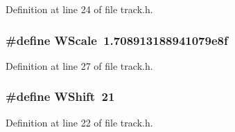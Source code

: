 Definition at line 24 of file track.\+h.

\subsubsection[{\texorpdfstring{W\+Scale}{WScale}}]{\setlength{\rightskip}{0pt plus 5cm}\#define W\+Scale~1.\+708913188941079e8f}\hypertarget{lib-src_2sbsms_2src_2track_8h_a45fec6fa7488d43660c17f575f08c17c}{}\label{lib-src_2sbsms_2src_2track_8h_a45fec6fa7488d43660c17f575f08c17c}


Definition at line 27 of file track.\+h.

\subsubsection[{\texorpdfstring{W\+Shift}{WShift}}]{\setlength{\rightskip}{0pt plus 5cm}\#define W\+Shift~21}\hypertarget{lib-src_2sbsms_2src_2track_8h_a2b8843acad228e9cf88ad12507920d98}{}\label{lib-src_2sbsms_2src_2track_8h_a2b8843acad228e9cf88ad12507920d98}


Definition at line 22 of file track.\+h.


